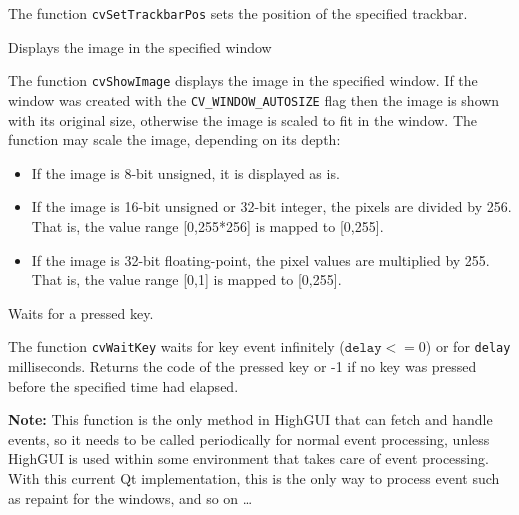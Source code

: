 \begin{description}
\end{description}

The function \texttt{cvSetTrackbarPos} sets the position of the specified trackbar.

Displays the image in the specified window


\begin{description}
\end{description}

The function \texttt{cvShowImage} displays the image in the specified window. If the window was created with the \texttt{CV\_WINDOW\_AUTOSIZE} flag then the image is shown with its original size, otherwise the image is scaled to fit in the window. The function may scale the image, depending on its depth:
\begin{itemize}
    \item If the image is 8-bit unsigned, it is displayed as is.
    \item If the image is 16-bit unsigned or 32-bit integer, the pixels are divided by 256. That is, the value range [0,255*256] is mapped to [0,255].
    \item If the image is 32-bit floating-point, the pixel values are multiplied by 255. That is, the value range [0,1] is mapped to [0,255].
\end{itemize}

Waits for a pressed key.


\begin{description}
\end{description}

The function \texttt{cvWaitKey} waits for key event infinitely ($ \texttt{delay} <= 0$) or for \texttt{delay} milliseconds. Returns the code of the pressed key or -1 if no key was pressed before the specified time had elapsed.

\textbf{Note:} This function is the only method in HighGUI that can fetch and handle events, so it needs to be called periodically for normal event processing, unless HighGUI is used within some environment that takes care of event processing. With this current Qt implementation, this is the only way to process event such as repaint for the windows, and so on \ldots

